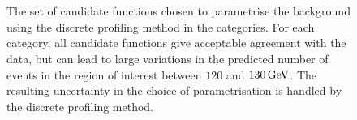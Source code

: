 \begin{figure}[p]
 \begin{center}
 \\
 \\
 \caption{The set of candidate functions chosen to parametrise the background using the discrete profiling method in the \Untagged categories. For each category, all candidate functions give acceptable agreement with the data, but can lead to large variations in the predicted number of events in the region of interest between $120$ and $130\,\text{Ge\hspace{-.08em}V}$. The resulting uncertainty in the choice of parametrisation is handled by the discrete profiling method.}
 \label{fig:model_bkg_multipdf}
 \end{center}
\end{figure}

